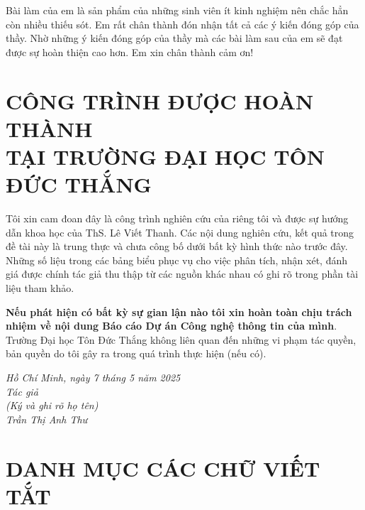 \documentclass[13pt]{article}
\begin{document}
Bài làm của em là sản phẩm của những sinh viên ít kinh nghiệm nên chắc hẳn còn nhiều thiếu sót. Em rất chân thành đón nhận tất cả các ý kiến đóng góp của thầy. Nhờ những ý kiến đóng góp của thầy mà các bài làm sau của em sẽ đạt được sự hoàn thiện cao hơn.
Em xin chân thành cảm ơn!



\newpage
\section*{\centering CÔNG TRÌNH ĐƯỢC HOÀN THÀNH\\TẠI TRƯỜNG ĐẠI HỌC TÔN ĐỨC THẮNG}

Tôi xin cam đoan đây là công trình nghiên cứu của riêng tôi và được sự hướng dẫn khoa học của ThS. Lê Viết Thanh. Các nội dung nghiên cứu, kết quả trong đề tài này là trung thực và chưa công bố dưới bất kỳ hình thức nào trước đây. Những số liệu trong các bảng biểu phục vụ cho việc phân tích, nhận xét, đánh giá được chính tác giả thu thập từ các nguồn khác nhau có ghi rõ trong phần tài liệu tham khảo.
 
\textbf{Nếu phát hiện có bất kỳ sự gian lận nào tôi xin hoàn toàn chịu trách nhiệm về nội dung Báo cáo Dự án Công nghệ thông tin của mình}. Trường Đại học Tôn Đức Thắng không liên quan đến những vi phạm tác quyền, bản quyền do tôi gây ra trong quá trình thực hiện (nếu có).
\begin{center}
    \textit{
        \hspace*{7cm}Hồ Chí Minh, ngày 7 tháng 5 năm 2025 \\
        \hspace*{7cm}Tác giả\\
        \hspace*{7cm}(Ký và ghi rõ họ tên)\\
        \vspace*{0.2cm}
        \vspace*{1cm}
        \hspace*{7cm}Trần Thị Anh Thư
        }
\end{center}



	\newpage
	\tableofcontents
	\newpage
	\setcounter{page}{1}


\section*{\centering DANH MỤC CÁC CHỮ VIẾT TẮT}
{}
\end{document}
